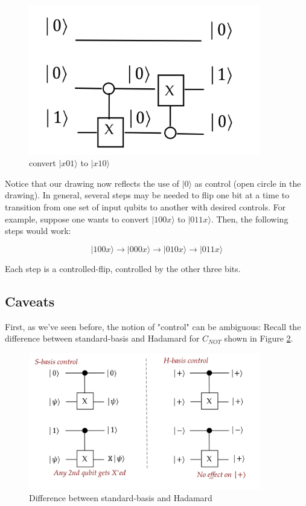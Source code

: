 \documentclass[main.tex]{subfiles}
\begin{document}
    \begin{figure}
        \centering
        \includegraphics[width=4in]{notes/figs/n08/46convert4.png}
        \caption{convert $|x 01\rangle$ to $|x 10\rangle$}
        \label{fig:46convert4}
    \end{figure}
    
    Notice that our drawing now reflects the use of $|0\rangle$ as control (open circle in the drawing). In general, several steps may be needed to flip one bit at a time to transition from one set of input qubits to another with desired controls. For example, suppose one wants to convert $|100 x\rangle$ to $|011 x\rangle$. Then, the following steps would work:
    
    $$
    |100 x\rangle \rightarrow|000 x\rangle \rightarrow|010 x\rangle \rightarrow|011 x\rangle
    $$

    Each step is a controlled-flip, controlled by the other three bits.

\subsection{Caveats}

    First, as we've seen before, the notion of "control" can be ambiguous: Recall the difference between standard-basis and Hadamard for $C_{NOT}$ shown in Figure \ref{fig:47caveat1}.
    
    \begin{figure}
        \centering
        \includegraphics[width=4in]{notes/figs/n08/47caveat1.png}
        \caption{Difference between standard-basis and Hadamard}
        \label{fig:47caveat1}
    \end{figure}
    
\end{document}
